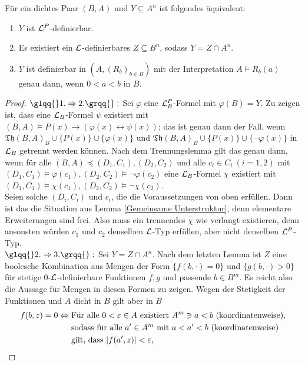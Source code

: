 \begin{theorem}\label{Definierbare Mengen}
	Für ein dichtes Paar $(B,A)$ und $Y\subseteq A^n$ ist folgendes äquivalent:
	\begin{enumerate}
		\item $Y$ ist $\mathcal{L}^P$-definierbar.
		\item Es existiert ein $\mathcal{L}$-definierbares $Z\subseteq B^n$, sodass $Y=Z\cap A^n$.
		\item $Y$ ist definierbar in $(A,(R_b)_{b\in B})$ mit der Interpretation $A\models R_b(a)$ genau dann, wenn $0<a<b$ in $B$.
	\end{enumerate}
\end{theorem}
\begin{proof}
	$\glqq{}1.\Rightarrow 2.\grqq{}:$ Sei $\varphi$ eine $\mathcal{L}^P_B$-Formel mit $\varphi(B)=Y$. Zu zeigen ist, dass eine $\mathcal{L}_B$-Formel $\psi$ existiert mit $(B,A)\models P(x)\rightarrow(\varphi(x)\leftrightarrow\psi(x))$; das ist genau dann der Fall, wenn $\mathfrak{Th}(B,A)_B\cup\{P(x)\}\cup\{\varphi(x)\}$ und $\mathfrak{Th}(B,A)_B\cup\{P(x)\}\cup\{\neg\varphi(x)\}$ in $\mathcal{L}_B$ getrennt werden können. Nach dem Trennungslemma gilt das genau dann, wenn für alle $(B,A)\preceq(D_1,C_1),(D_2,C_2)$ und alle $c_i\in C_i\ (i=1,2)$ mit $(D_1,C_1)\models\varphi(c_1),(D_2,C_2)\models\neg\varphi(c_2)$ eine $\mathcal{L}_B$-Formel $\chi$ existiert mit $(D_1,C_1)\models\chi(c_1),(D_2,C_2)\models\neg\chi(c_2)$.\\
	Seien solche $(D_i,C_i)$ und $c_i$, die die Voraussetzungen von oben erfüllen. Dann ist das die Situation aus Lemma \ref{Gemeinsame Unterstruktur}, denn elementare Erweiterungen sind frei. Also muss ein trennendes $\chi$ wie verlangt existieren, denn ansonsten würden $c_1$ und $c_2$ denselben $\mathcal{L}$-Typ erfüllen, aber nicht denselben $\mathcal{L}^P$-Typ.\\
	$\glqq{}2.\Rightarrow 3.\grqq{}:$ Sei $Y=Z\cap A^n$. Nach dem letzten Lemma ist $Z$ eine boolesche Kombination aus Mengen der Form $\{f(b,\cdot)=0\}$ und $\{g(b,\cdot)>0\}$ für stetige 0-$\mathcal{L}$-definierbare Funktionen $f,g$ und passende $b\in B^m$. Es reicht also die Aussage für Mengen in diesen Formen zu zeigen. Wegen der Stetigkeit der Funktionen und $A$ dicht in $B$ gilt aber in $B$
	\begin{align*}
	f(b,z)=0\Leftrightarrow\ &\text{Für alle }0<\varepsilon\in A\text{ existiert }A^m\ni a<b\text{ (koordinatenweise),}\\&\text{sodass für alle }a'\in A^m\text{ mit }a<a'<b\text{ (koordinatenweise)}\\&\text{gilt, dass }\abs{f(a',z)}<\varepsilon,\\

\end{align*}
\end{proof}

